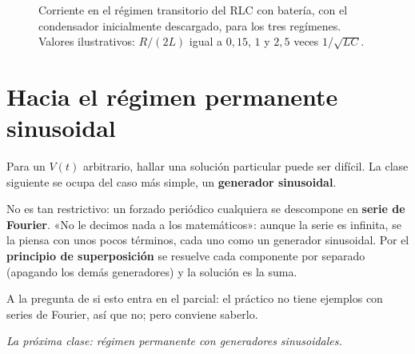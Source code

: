 \documentclass[12pt,a4paper]{article}
\begin{document}
\begin{figure}[H]
  \centering
  
  \caption{Corriente en el régimen transitorio del RLC con batería, con el condensador inicialmente descargado, para los tres regímenes. Valores ilustrativos: $R/(2L)$ igual a $0{,}15$, $1$ y $2{,}5$ veces $1/\sqrt{LC}$.}
\end{figure}

\section{Hacia el régimen permanente sinusoidal}

Para un $V(t)$ arbitrario, hallar una solución particular puede ser difícil.
La clase siguiente se ocupa del caso más simple, un \textbf{generador sinusoidal}.

No es tan restrictivo: un forzado periódico cualquiera se descompone en \textbf{serie
de Fourier}. «No le decimos nada a los matemáticos»: aunque la serie es
infinita, se la piensa con unos pocos términos, cada uno como un generador
sinusoidal. Por el \textbf{principio de superposición} se resuelve cada componente
por separado (apagando los demás generadores) y la solución es la suma.

\begin{notebox}
A la pregunta de si esto entra en el parcial: el práctico no tiene ejemplos
con series de Fourier, así que no; pero conviene saberlo.
\end{notebox}

\noindent\emph{La próxima clase: régimen permanente con generadores sinusoidales.}
\end{document}
